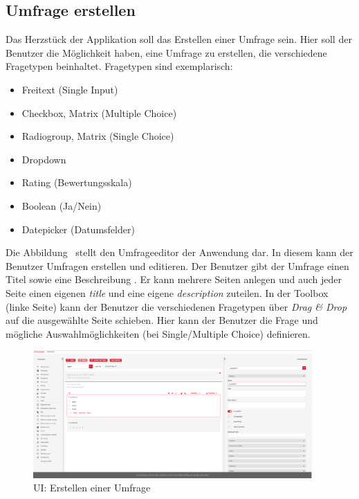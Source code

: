 
\subsection{Umfrage erstellen}
\label{ssec:UmfrageErstellen}

Das Herzstück der Applikation soll das Erstellen einer Umfrage sein.
Hier soll der Benutzer die Möglichkeit haben, eine Umfrage zu erstellen, die verschiedene Fragetypen beinhaltet.
Fragetypen sind exemplarisch:
%
\begin{itemize}
	\item Freitext (Single Input)
	\item Checkbox, Matrix (Multiple Choice)
	\item Radiogroup, Matrix (Single Choice)
	\item Dropdown
	\item Rating (Bewertungsskala)
	\item Boolean (Ja/Nein)
	\item Datepicker (Datumsfelder)
\end{itemize}
%

Die Abbildung~ stellt den Umfrageeditor der Anwendung dar.
In diesem kann der Benutzer Umfragen erstellen und editieren.
Der Benutzer gibt der Umfrage einen Titel  sowie eine Beschreibung .
Er kann mehrere Seiten anlegen und auch jeder Seite einen eigenen \emph{title} und eine eigene \emph{description} zuteilen. \newline
In der Toolbox (linke Seite) kann der Benutzer die verschiedenen Fragetypen über \emph{Drag \& Drop} auf die ausgewählte Seite schieben.
Hier kann der Benutzer die Frage und mögliche Auswahlmöglichkeiten (bei Single/Multiple Choice) definieren.

\begin{figure}[!htb]
	\centering
	\includegraphics[width=0.95\textwidth, keepaspectratio]{img/client/CreateSurveyMaster.png}
	\captionsetup{justification=centering, format=plain}
	\caption[\acl{UI}: Erstellen einer Umfrage]{\acl{UI}: Erstellen einer Umfrage \\ \quelleScreenshot}
	\label{fig:SurveyCreatorImplement}
\end{figure}

